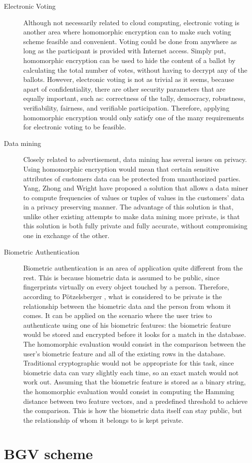 \begin{description}
\item[Electronic Voting] Although not necessarily related to cloud computing, electronic voting is another area where homomorphic encryption can to make such voting scheme feasible and convenient. Voting could be done from anywhere as long as the participant is provided with Internet access. Simply put, homomorphic encryption can be used to hide the content of a ballot by calculating the total number of votes, without having to decrypt any of the ballots. However, electronic voting is not as trivial as it seems, because apart of confidentiality, there are other security parameters that are equally important, such as: correctness of the tally, democracy, robustness, verifiability, fairness, and verifiable participation. Therefore, applying homomorphic encryption would only satisfy one of the many requirements for electronic voting to be feasible.
\item[Data mining] Closely related to advertisement, data mining has several issues on privacy. Using homomorphic encryption would mean that certain sensitive attributes of customers data can be protected from unauthorized parties. Yang, Zhong and Wright \cite{YangZhongWright} have proposed a solution that allows a data miner to compute frequencies of values or tuples of values in the customers' data in a privacy preserving manner. The advantage of this solution is that, unlike other existing attempts to make data mining more private, is that this solution is both fully private and fully accurate, without compromising one in exchange of the other.
\item[Biometric Authentication] Biometric authentication is an area of application quite different from the rest. This is because biometric data is assumed to be public, since fingerprints virtually on every object touched by a person. Therefore, according to P{\"o}tzelsberger \cite{potzelsberger2013kv}, what is considered to be private is the relationship between the biometric data and the person from whom it comes. It can be applied on the scenario where the user tries to authenticate using one of his biometric features: the biometric feature would be stored and encrypted before it looks for a match in the database. The homomorphic evaluation would consist in the comparison between the user's biometric feature and all of the existing rows in the database. Traditional cryptographic would not be appropriate for this task, since biometric data can vary slightly each time, so an exact match would not work out. Assuming that the biometric feature is stored as a binary string, the homomorphic evaluation would consist in computing the Hamming distance between two feature vectors, and a predefined threshold to achieve the comparison. This is how the biometric data itself can stay public, but the relationship of whom it belongs to is kept private.
\end{description}

\section{BGV scheme}



\clearpage
